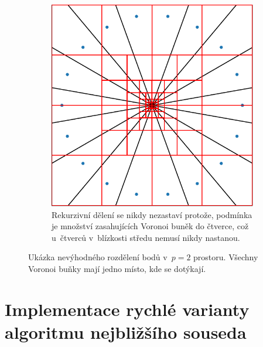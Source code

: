\begin{figure}
\begin{subfigure}[t]{0.45\columnwidth}
    \includegraphics[scale=0.45]{obrazky-figures/testing/circletest_part2.pdf}
    \caption{Rekurzivní dělení se nikdy nezastaví protože, podmínka je množství zasahujících Voronoi buněk do čtverce, což u~čtverců v~blízkosti středu nemusí nikdy nastanou.}
\end{subfigure}
    \caption{Ukázka nevýhodného rozdělení bodů v~$p=2$ prostoru. Všechny Voronoi buňky mají jedno místo, kde se dotýkají.  }
    \label{fig:degenerative_case}
\end{figure}


















\chapter{Implementace rychlé varianty algoritmu nejbližšího souseda}


